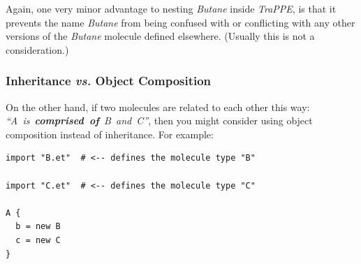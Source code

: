 \documentclass[11pt]{article}
\begin{document}
  Again, one very minor advantage to nesting 
\textit{Butane} inside \textit{TraPPE}, is that it prevents the name
\textit{Butane} from being confused with or conflicting with any other 
versions of the \textit{Butane} molecule defined elsewhere.
(Usually this is not a consideration.)

\subsubsection{Inheritance \textit{vs.} Object Composition}
\label{sec:inheritance_vs_object_composition}
On the other hand, if two molecules are related to each other this way:
\mbox{\textit{``A is \textbf{comprised of} B and C''}},
then you might consider using object composition instead of inheritance.
For example:
\begin{verbatim}
import "B.et"  # <-- defines the molecule type "B"

import "C.et"  # <-- defines the molecule type "C"

A {
  b = new B
  c = new C
}
\end{verbatim}





\end{document}
